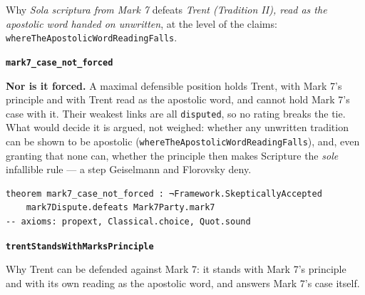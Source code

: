 \documentclass[11pt]{article}
\begin{document}
\noindent Why \emph{Sola scriptura from Mark 7} defeats \emph{Trent (Tradition II), read as the apostolic word handed on unwritten}, at the level of the claims: \texttt{where\allowbreak{}The\allowbreak{}Apostolic\allowbreak{}Word\allowbreak{}Reading\allowbreak{}Falls}.
\par\medskip\noindent\textbf{\texttt{mark7\_\allowbreak{}case\_\allowbreak{}not\_\allowbreak{}forced}}\par\nobreak\noindent
\textbf{Nor is it forced.} A maximal defensible position holds Trent, with Mark 7’s principle and with Trent read as the apostolic word, and cannot hold Mark 7’s case with it. Their weakest links are all \texttt{disputed}, so no rating breaks the tie. What would decide it is argued, not weighed: whether any unwritten tradition can be shown to be apostolic (\texttt{where\allowbreak{}The\allowbreak{}Apostolic\allowbreak{}Word\allowbreak{}Reading\allowbreak{}Falls}), and, even granting that none can, whether the principle then makes Scripture the \emph{sole} infallible rule — a step Geiselmann and Florovsky deny.

{\small\begin{verbatim}
theorem mark7_case_not_forced : ¬Framework.SkepticallyAccepted
    mark7Dispute.defeats Mark7Party.mark7
-- axioms: propext, Classical.choice, Quot.sound
\end{verbatim}}
\par\medskip\noindent\textbf{\texttt{trent\allowbreak{}Stands\allowbreak{}With\allowbreak{}Marks\allowbreak{}Principle}}\par\nobreak\noindent
Why Trent can be defended against Mark 7: it stands with Mark 7’s principle and with its own reading as the apostolic word, and answers Mark 7’s case itself.
\end{document}
